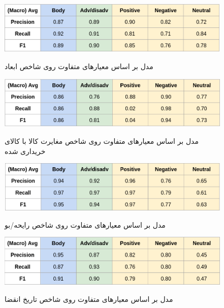 
\begin{figure}[H]
\centering
\caption{ ‌مدل بر اساس معیارهای متفاوت روی شاخص ابعاد}\label{}
\includegraphics[width=15cm]{figs/size.png}
\label{fig:test}
\end{figure}




\begin{figure}[H]
\centering
\caption{ ‌مدل بر اساس معیارهای متفاوت روی شاخص مغایرت کالا با کالای خریداری شده}\label{}
\includegraphics[width=15cm]{figs/discrepcency.png}
\label{fig:test}
\end{figure}



\begin{figure}[H]
\centering
\caption{ ‌مدل بر اساس معیارهای متفاوت روی شاخص رایحه/بو}\label{}
\includegraphics[width=15cm]{figs/flavor.png}
\label{fig:test}
\end{figure}




\begin{figure}[H]
\centering
\caption{ ‌مدل بر اساس معیارهای متفاوت روی شاخص تاریخ انقضا}\label{}
\includegraphics[width=15cm]{figs/expire.png}
\label{fig:test}
\end{figure}


